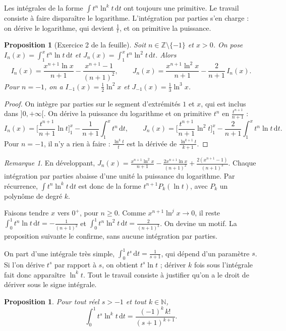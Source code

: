 \documentclass[11pt,a4paper]{article}
\theoremstyle{plain}
\newtheorem{proposition}[theoreme]{Proposition}
\theoremstyle{definition}
\theoremstyle{remark}
\newtheorem{remarque}[theoreme]{Remarque}
\newcommand{\N}{\mathbb{N}}
\newcommand{\Z}{\mathbb{Z}}
\newcommand{\dd}{\,\mathrm{d}}
\begin{document}
Les intégrales de la forme $\int t^n\ln^kt\dd t$ ont toujours une primitive. Le travail consiste à faire disparaître le logarithme. L'intégration par parties s'en charge : on dérive le logarithme, qui devient $\frac1t$, et on primitive la puissance.

\begin{proposition}[Exercice 2 de la feuille]\label{prop:ipp-log}
Soit $n\in\Z\setminus\{-1\}$ et $x>0$. On pose $I_n(x)=\int_1^xt^n\ln t\dd t$ et $J_n(x)=\int_1^xt^n\ln^2t\dd t$. Alors
\[
  I_n(x)=\frac{x^{n+1}\ln x}{n+1}-\frac{x^{n+1}-1}{(n+1)^2},\qquad
  J_n(x)=\frac{x^{n+1}\ln^2x}{n+1}-\frac{2}{n+1}\,I_n(x).
\]
Pour $n=-1$, on a $I_{-1}(x)=\frac12\ln^2x$ et $J_{-1}(x)=\frac13\ln^3x$.
\end{proposition}

\begin{proof}
On intègre par parties sur le segment d'extrémités $1$ et $x$, qui est inclus dans $]0,+\infty[$. On dérive la puissance du logarithme et on primitive $t^n$ en $\frac{t^{n+1}}{n+1}$ :
\[
  I_n(x)=\Big[\frac{t^{n+1}}{n+1}\ln t\Big]_1^x-\frac1{n+1}\int_1^xt^n\dd t,\qquad
  J_n(x)=\Big[\frac{t^{n+1}}{n+1}\ln^2t\Big]_1^x-\frac2{n+1}\int_1^xt^n\ln t\dd t .
\]
Pour $n=-1$, il n'y a rien à faire : $\frac{\ln^kt}{t}$ est la dérivée de $\frac{\ln^{k+1}t}{k+1}$.
\end{proof}

\begin{remarque}
En développant, $J_n(x)=\frac{x^{n+1}\ln^2x}{n+1}-\frac{2x^{n+1}\ln x}{(n+1)^2}+\frac{2(x^{n+1}-1)}{(n+1)^3}$. Chaque intégration par parties abaisse d'une unité la puissance du logarithme. Par récurrence, $\int t^n\ln^kt\dd t$ est donc de la forme $t^{n+1}P_k(\ln t)$, avec $P_k$ un polynôme de degré $k$.

Faisons tendre $x$ vers $0^+$, pour $n\geq0$. Comme $x^{n+1}\ln^jx\to0$, il reste $\int_0^1t^n\ln t\dd t=-\frac1{(n+1)^2}$ et $\int_0^1t^n\ln^2t\dd t=\frac{2}{(n+1)^3}$. On devine un motif. La proposition suivante le confirme, sans aucune intégration par parties.
\end{remarque}

On part d'une intégrale très simple, $\int_0^1t^s\dd t=\frac1{s+1}$, qui dépend d'un paramètre $s$. Si l'on dérive $t^s$ par rapport à $s$, on obtient $t^s\ln t$ ; dériver $k$ fois sous l'intégrale fait donc apparaître $\ln^kt$. Tout le travail consiste à justifier qu'on a le droit de dériver sous le signe intégrale.

\begin{proposition}\label{prop:moments-log}
Pour tout réel $s>-1$ et tout $k\in\N$,
\[
  \int_0^1t^s\ln^kt\dd t=\frac{(-1)^k\,k!}{(s+1)^{k+1}} .
\]
\end{proposition}
\end{document}
